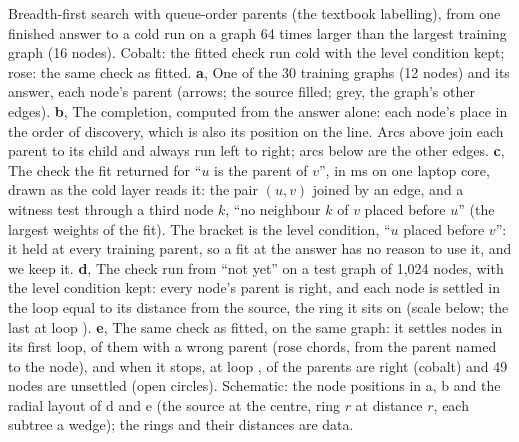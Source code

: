  Breadth-first search with queue-order parents (the textbook labelling), from one finished answer to a cold run on a graph 64
times larger than the largest training graph (16 nodes). Cobalt: the fitted check run cold with the level condition kept; rose: the same check as
fitted. \textbf{a}, One of the 30 training graphs (12 nodes) and its answer, each node's parent (arrows; the source
filled; grey, the graph's other edges). \textbf{b}, The completion, computed from the answer alone: each node's place in
the order of discovery, which is also its position on the line. Arcs above join each parent to its child and always
run left to right; arcs below are the other edges. \textbf{c}, The check the fit returned for ``$u$ is the parent of
$v$'', in  ms on one laptop core, drawn as the cold layer reads it: the pair $(u, v)$ joined by an edge, and a witness
test through a third node $k$, ``no neighbour $k$ of $v$ placed before $u$'' (the largest weights of the fit). The
bracket is the level condition, ``$u$ placed before $v$'': it held at every training parent, so a fit at the answer has
no reason to use it, and we keep it. \textbf{d}, The check run from ``not yet'' on a test graph of 1,024 nodes, with the
level condition kept: every node's parent is right, and each node is settled in the loop equal to its distance from the
source, the ring it sits on (scale below; the last at loop ). \textbf{e}, The same check as fitted, on the same graph:
it settles  nodes in its first loop,  of them with a wrong parent (rose chords, from the parent named to the
node), and when it stops, at loop ,  of the  parents are right (cobalt) and 49 nodes are unsettled (open
circles). Schematic: the node positions in a, b and the radial layout of d and e (the source at the centre, ring $r$ at
distance $r$, each subtree a wedge); the rings and their distances are data.
